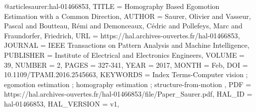 @article{saurer:hal-01466853,
	TITLE = {{Homography Based Egomotion Estimation with a Common Direction}},
	AUTHOR = {Saurer, Olivier and Vasseur, Pascal and Boutteau, R{\'e}mi and Demonceaux, C{\'e}dric and Pollefeys, Marc and Fraundorfer, Friedrich},
	URL = {https://hal.archives-ouvertes.fr/hal-01466853},
	JOURNAL = {{IEEE Transactions on Pattern Analysis and Machine Intelligence}},
	PUBLISHER = {{Institute of Electrical and Electronics Engineers}},
	VOLUME = {39},
	NUMBER = {2},
	PAGES = {327-341},
	YEAR = {2017},
	MONTH = Feb,
	DOI = {10.1109/TPAMI.2016.2545663},
	KEYWORDS = {Index Terms-Computer vision ; egomotion estimation ; homography estimation ; structure-from-motion },
	PDF = {https://hal.archives-ouvertes.fr/hal-01466853/file/Paper_Saurer.pdf},
	HAL_ID = {hal-01466853},
	HAL_VERSION = {v1},
}
